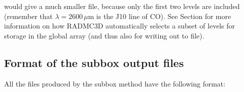 \documentclass[letterpaper,10pt,english]{sphinxmanual}
\begin{document}
would give a much smaller  file, because only the
first two levels are included (remember that \(\lambda=2600\,\mu\)m is the
J1\sphinxhyphen{}0 line of CO). See Section {\hyperref[\detokenize{lineradtrans:sec-calcstore-levpop}]{}} for more information
on how RADMC\sphinxhyphen{}3D automatically selects a subset of levels for storage in the
global array (and thus also for writing out to file).


\subsection{Format of the subbox output files}
\label{\detokenize{toolsinside:format-of-the-subbox-output-files}}
All the files produced by the subbox method have the following format:
\end{document}
